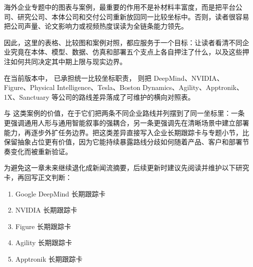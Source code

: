 海外企业专题中的图表与案例，最重要的作用不是补材料丰富度，而是把平台公司、研究公司、本体公司和交付公司重新放回同一比较坐标中。否则，读者很容易把公司声量、论文影响力或视频热度误读为全链条能力领先。

因此，这里的表格、比较图和案例对照，都应服务于一个目标：让读者看清不同企业究竟在本体、模型、数据、仿真和部署五个支点上各自押注了什么，以及这些押注如何共同决定其中期上限与现实边界。

在当前版本中，\texttt{} 已承担统一比较坐标职责，\texttt{} 则把 DeepMind、NVIDIA、Figure、Physical Intelligence、Tesla、Boston Dynamics、Agility、Apptronik、1X、Sanctuary 等公司的路线差异落成了可维护的横向对照表。

\texttt{} 与 \texttt{} 这类案例的价值，在于它们把两条不同企业路线并列摆到了同一坐标里：一条更强调通用人形与通用智能叙事的强耦合，另一条更强调先在清晰场景中建立部署能力，再逐步外扩任务边界。把这类差异直接写入企业长期跟踪卡与专题小节，比保留抽象占位更有价值，因为它能持续暴露路线分歧如何随着产品、客户和部署节奏变化而被重新验证。

为避免这一章未来继续退化成新闻流摘要，后续更新时建议先阅读并维护以下研究卡，再回写正文判断：

\begin{enumerate}
\item Google DeepMind 长期跟踪卡
\item NVIDIA 长期跟踪卡
\item Figure 长期跟踪卡
\item Agility 长期跟踪卡
\item Apptronik 长期跟踪卡
\end{enumerate}

